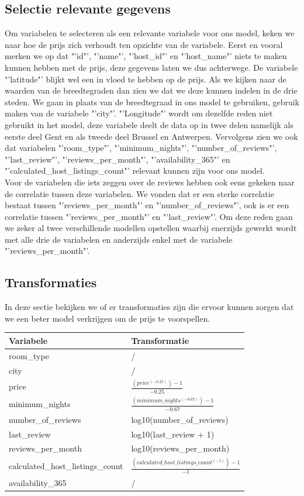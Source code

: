 \documentclass[a4paper,kulak]{kulakarticle} %
\begin{document}
\subsection{Selectie relevante gegevens}
Om variabelen te selecteren als een relevante variabele voor ons model, keken we naar hoe de prijs zich verhoudt ten opzichte van de variabele. Eerst en vooral merken we op dat "'id"', "'name"', "'host\_id"' en "'host\_name"' niets te maken kunnen hebben met de prijs, deze gegevens laten we dus achterwege. De variabele "'latitude"' blijkt wel een in vloed te hebben op de prijs. Als we kijken naar de waarden van de breedtegraden dan zien we dat we deze kunnen indelen in de drie steden. We gaan in plaats van de breedtegraad in ons model te gebruiken, gebruik maken van de variabele "'city"'. "'Longitude"' wordt om dezelfde reden niet gebruikt in het model, deze variabele deelt de data op in twee delen namelijk als eerste deel Gent en als tweede deel Brussel en Antwerpen. Vervolgens zien we ook dat variabelen "'room\_type"', "'minimum\_nights"', "'number\_of\_reviews"', "'last\_review"', "'reviews\_per\_month"', "'availability\_365"' en "'calculated\_host\_listings\_count"' relevant kunnen zijn voor ons model. \\

Voor de variabelen die iets zeggen over de reviews hebben ook eens gekeken naar de correlatie tussen deze variabelen. We vonden dat er een sterke correlatie bestaat tussen "'reviews\_per\_month"' en "'number\_of\_reviews"', ook is er een correlatie tussen "'reviews\_per\_month"' en "'last\_review"'. Om deze reden gaan we zeker al twee verschillende modellen opstellen waarbij enerzijds gewerkt wordt met alle drie de variabelen en anderzijds enkel met de variabele "'reviews\_per\_month"'.
\subsection{Transformaties}
In deze sectie bekijken we of er transformaties zijn die ervoor kunnen zorgen dat we een beter model verkrijgen om de prijs te voorspellen. 
\begin{tabular}{|l|l|}
	\hline 
	\textbf{Variabele} & \textbf{Transformatie} \\ 
	\hline 
	room\_type & / \\ 
	\hline 
	city & / \\ 
	\hline 
	price & $\frac{(price^{(-0.25)}) - 1}{-0.25}$ \\ 
	\hline 
	minimum\_nights & $\frac{(minimum\_nights^{(-0.67)}) - 1}{-0.67}$ \\ 
	\hline 
	number\_of\_reviews &  log10(number\_of\_reviews)\\ 
	\hline 
	last\_review & log10(last\_review + 1)\\
	\hline
	reviews\_per\_month &log10(reviews\_per\_month) \\
	\hline
	calculated\_host\_listings\_count & $\frac{(calculated\_host\_listings\_count^{(-1)}) - 1}{-1}$\\
	\hline
	availability\_365 & /\\ \hline
\end{tabular} 
\end{document}
